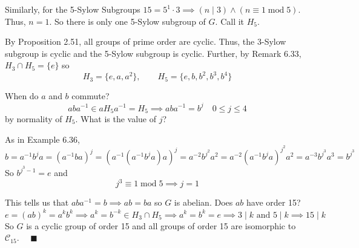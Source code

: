 \documentclass[12pt]{article}
\newcommand{\qed}{\quad \blacksquare}
\renewcommand{\mod}{\;\text{mod}\;}
\begin{document}
        Similarly, for the 5-Sylow Subgroups $15 = 5^1 \cdot 3 \implies (n \mid 3) \land (n \equiv 1 \mod 5)$. Thus, $n = 1$. So there is only one 5-Sylow subgroup of $G$. Call it $H_5$.

        By Proposition 2.51, all groups of prime order are cyclic. Thus, the 3-Sylow subgroup is cyclic and the 5-Sylow subgroup is cyclic. Further, by Remark 6.33, $H_3 \cap H_5 = \{e\}$ so 
        \[H_3 = \{e, a, a^2\}, \qquad H_5 = \{e, b, b^2, b^3, b^4\}\]

        When do $a$ and $b$ commute? 
        \[aba^{-1} \in aH_5a^{-1} = H_5 \implies aba^{-1} = b^j \quad 0 \leq j \leq 4\] 
        by normality of $H_5$. What is the value of $j$?

        As in Example 6.36, 
        \[b = a^{-1}b^ja = (a^{-1}ba)^j = (a^{-1}(a^{-1}b^ja)a)^j = a^{-2}b^{j^2}a^2 = a^{-2}(a^{-1}b^ja)^{j^2}a^2 = a^{-3}b^{j^3}a^3 = b^{j^3}\]
        So $b^{j^3 - 1} = e$ and 
        \[j^3 \equiv 1 \mod 5 \implies j = 1\]

        This tells us that $aba^{-1} = b \implies ab = ba$ so $G$ is abelian. Does $ab$ have order 15? 
        \[e = (ab)^k = a^k b^k \implies a^k = b^{-k} \in H_3 \cap H_5 \implies a^k = b^k = e \implies 3 \mid k \text{ and } 5 \mid k \implies 15 \mid k\]
        So $G$ is a cyclic group of order 15 and all groups of order 15 are isomorphic to $\mathcal{C}_{15}$. $\qed$

    \color{black}


\pagebreak
\end{document}
